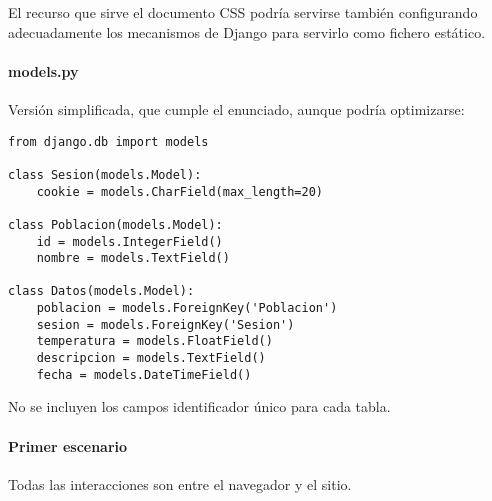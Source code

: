El recurso que sirve el documento CSS podría servirse también configurando
adecuadamente los mecanismos de Django para servirlo como fichero estático.

\paragraph{models.py}

Versión simplificada, que cumple el enunciado, aunque podría optimizarse:

\begin{verbatim}
from django.db import models

class Sesion(models.Model):
    cookie = models.CharField(max_length=20)

class Poblacion(models.Model):
    id = models.IntegerField()
    nombre = models.TextField()

class Datos(models.Model):
    poblacion = models.ForeignKey('Poblacion')
    sesion = models.ForeignKey('Sesion')
    temperatura = models.FloatField()
    descripcion = models.TextField()
    fecha = models.DateTimeField()
\end{verbatim}

No se incluyen los campos identificador único para cada tabla.

\paragraph{Primer escenario}

Todas las interacciones son entre el navegador y el sitio.

